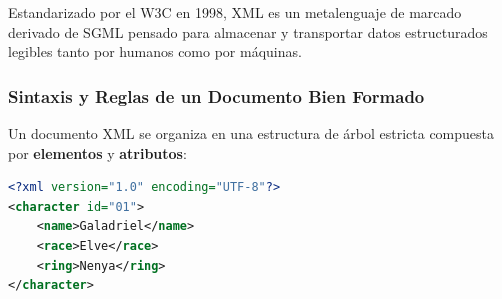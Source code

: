 Estandarizado por el W3C en 1998, XML es un metalenguaje de marcado derivado de SGML pensado para almacenar y transportar datos estructurados legibles tanto por humanos como por máquinas.

\subsubsection{Sintaxis y Reglas de un Documento Bien Formado}
Un documento XML se organiza en una estructura de árbol estricta compuesta por \textbf{elementos} y \textbf{atributos}:

\begin{lstlisting}[language=XML, caption={Estructura canónica de un archivo XML (tolkien.xml).}]
<?xml version="1.0" encoding="UTF-8"?>
<character id="01">
    <name>Galadriel</name>
    <race>Elve</race>
    <ring>Nenya</ring>
</character>
\end{lstlisting}

